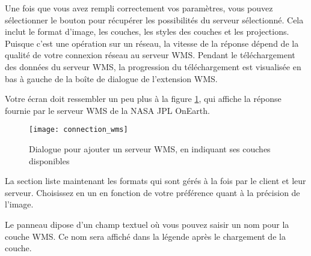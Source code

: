 Une fois que vous avez rempli correctement vos paramètres, vous pouvez sélectionner le bouton  pour récupérer les possibilités du serveur sélectionné. Cela inclut le format d'image, les couches, les styles des couches et les projections. Puisque c'est une opération sur un réseau, la vitesse de la réponse dépend de la qualité de votre connexion réseau au serveur WMS. Pendant le téléchargement des données du serveur WMS, la progression du téléchargement est visualisée en bas à gauche de la boîte de dialogue de l'extension WMS.

Votre écran doit ressembler un peu plus à la figure \ref{fig:connection_wms}, qui affiche la réponse fournie par le serveur WMS de la NASA JPL OnEarth.

\begin{figure}[ht]
\centering
\texttt{[image: connection\_wms]}
\caption{Dialogue pour ajouter un serveur WMS, en indiquant ses couches
disponibles \nixcaption}\label{fig:connection_wms}
\end{figure}


La section  liste maintenant les formats qui sont gérés à la fois par le client et leur serveur. Choisissez en un en fonction de votre préférence quant à la précision de l'image.


Le panneau  dipose d'un champ textuel où vous pouvez saisir un nom pour la couche WMS. Ce nom sera affiché dans la légende après le chargement de la couche.

